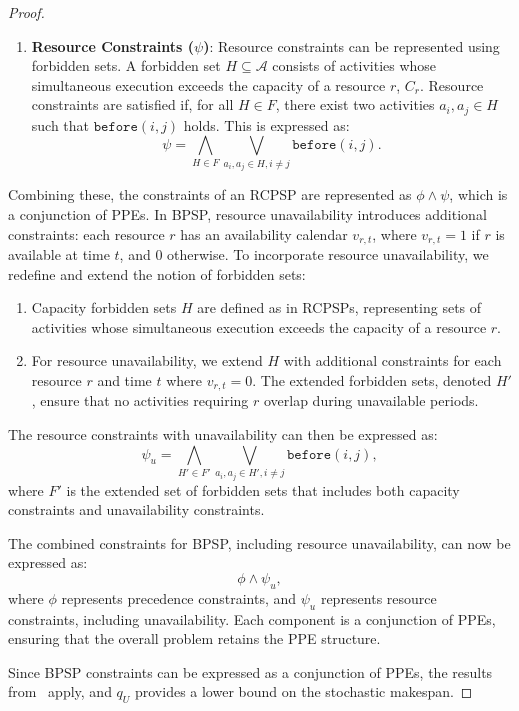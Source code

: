 \begin{proof}
\begin{enumerate}
    \item \textbf{Resource Constraints (\( \psi \))}: Resource constraints can be represented using forbidden sets. A forbidden set \( H \subseteq \mathcal{A} \) consists of activities whose simultaneous execution exceeds the capacity of a resource \( r \), $C_r$. Resource constraints are satisfied if, for all \( H \in F \), there exist two activities \( a_i, a_j \in H \) such that \( \texttt{before}(i, j) \) holds. This is expressed as:
    \[
    \psi = \bigwedge_{H \in F} \bigvee_{a_i, a_j \in H, i \neq j} \texttt{before}(i, j).
    \]
\end{enumerate} Combining these, the constraints of an RCPSP are represented as \( \phi \wedge \psi \), which is a conjunction of PPEs. In BPSP, resource unavailability introduces additional constraints:
each resource \( r \) has an availability calendar \( v_{r,t} \), where \( v_{r,t} = 1 \) if \( r \) is available at time \( t \), and \( 0 \) otherwise.
To incorporate resource unavailability, we redefine and extend the notion of forbidden sets:
\begin{enumerate}
    \item Capacity forbidden sets \( H \) are defined as in RCPSPs, representing sets of activities whose simultaneous execution exceeds the capacity of a resource \( r \).
    \item For resource unavailability, we extend \(H\) with additional constraints for each resource \( r \) and time \( t \) where \( v_{r,t} = 0 \). The extended forbidden sets, denoted $H'$, ensure that no activities requiring \( r \) overlap during unavailable periods.
\end{enumerate} The resource constraints with unavailability can then be expressed as:
\[
\psi_u = \bigwedge_{H' \in F'} \bigvee_{a_i, a_j \in H', i \neq j} \texttt{before}(i, j),
\]
where \( F' \) is the extended set of forbidden sets that includes both capacity constraints and unavailability constraints.

The combined constraints for BPSP, including resource unavailability, can now be expressed as:
\[
\phi \wedge \psi_u,
\]
where \( \phi \) represents precedence constraints, and \( \psi_u \) represents resource constraints, including unavailability. Each component is a conjunction of PPEs, ensuring that the overall problem retains the PPE structure.

Since BPSP constraints can be expressed as a conjunction of PPEs, the results from~\cite{beck2007proactive} apply, and \( q_U \) provides a lower bound on the stochastic makespan.
\end{proof} 


